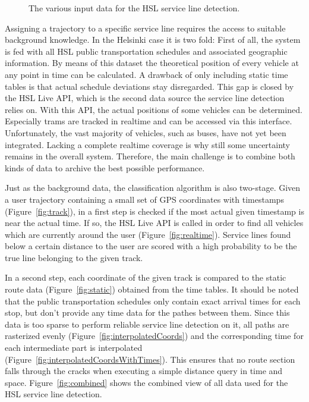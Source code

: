 \documentclass[external]{20120615_deliverable_template_ukob}
\theoremstyle{definition}
\begin{document}
\begin{figure}[ht]
{  \label{fig:interpolatedCoordsWithTimes}
  \setcounter{subfigure}{5}
} 
\caption{
The various input data for the HSL service line detection.
}
\label{fig:SLD}
\end{figure}

Assigning a trajectory to a specific service line requires the access to suitable background knowledge. In the Helsinki case it is two fold:
First of all, the system is fed with all HSL public transportation schedules and associated geographic information. By means of this dataset the theoretical position of every vehicle at any point in time can be calculated. A drawback of only including static time tables is that actual schedule deviations stay disregarded. This gap is closed by the HSL Live API, which is the second data source the service line detection relies on. With this API, the actual positions of some vehicles can be determined. Especially trams are tracked in realtime and can be accessed via this interface.  Unfortunately, the vast majority of vehicles, such as buses, have not yet been integrated. Lacking a complete realtime coverage is why still some uncertainty remains in the overall system. Therefore, the main challenge is to combine both kinds of data to archive the best possible performance.

Just as the background data, the classification algorithm is also two-stage. Given a user trajectory containing a small set of GPS coordinates with timestamps (Figure~\ref{fig:track}), in a first step is checked if the most actual given timestamp is near the actual time. If so, the HSL Live API is called in order to find all vehicles which are currently around the user (Figure~\ref{fig:realtime}). Service lines found below a certain distance to the user are scored with a high probability to be the true line belonging to the given track.

In a second step, each coordinate of the given track is compared to the static route data (Figure~\ref{fig:static}) obtained from the time tables. 
It should be noted that the public transportation schedules only contain exact arrival times for each stop, but don't provide any time data for the pathes between them. Since this data is too sparse to perform reliable service line detection on it, all paths are rasterized evenly (Figure~\ref{fig:interpolatedCoords}) and the corresponding time for each intermediate part is interpolated (Figure~\ref{fig:interpolatedCoordsWithTimes}). This ensures that no route section falls through the cracks when executing a simple distance query in time and space. Figure~\ref{fig:combined} shows the combined view of all data used for the HSL service line detection.
\end{document}

